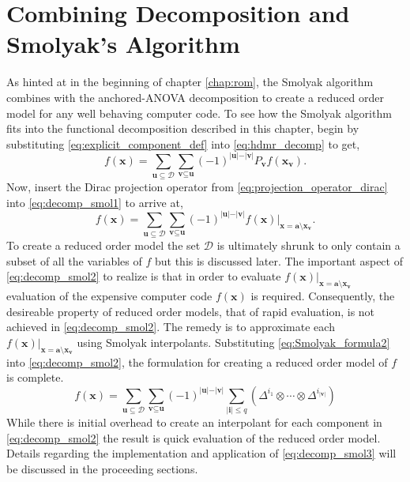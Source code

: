 \section{Combining Decomposition and Smolyak's Algorithm} \label{sec:decomp_and_interp}

As hinted at in the beginning of chapter \ref{chap:rom}, the Smolyak algorithm combines with the anchored-\ac{ANOVA} decomposition to create a reduced order model for any well behaving computer code. To see how the Smolyak algorithm fits into the functional decomposition described in this chapter, begin by substituting \ref{eq:explicit_component_def} into \ref{eq:hdmr_decomp} to get,
\begin{equation} \label{eq:decomp_smol1}
   f(\textbf{x}) = 
    \sum_{\textbf{u}\subseteq\mathcal{D}}
     \sum_{\textbf{v}\subseteq\textbf{u}} 
      (-1)^{\vert\textbf{u}\vert - \vert\textbf{v}\vert}
       P_{\textbf{v}} f(\textbf{x}_{\textbf{v}}).
\end{equation} 
Now, insert the Dirac projection operator from \ref{eq:projection_operator_dirac} into \ref{eq:decomp_smol1} to arrive at,  
\begin{equation} \label{eq:decomp_smol2}
   f(\textbf{x}) = 
    \sum_{\textbf{u}\subseteq\mathcal{D}}
     \sum_{\textbf{v}\subseteq\textbf{u}} 
      (-1)^{\vert\textbf{u}\vert - \vert\textbf{v}\vert}
       f(\textbf{x})\vert_{  
        \textbf{x}=\textbf{a}\setminus\textbf{x}_{\textbf{v}} }.   
\end{equation}
To create a reduced order model the set $\mathcal{D}$ is ultimately shrunk to only contain a subset of all the variables of $f$ but this is discussed later. The important aspect of \ref{eq:decomp_smol2} to realize is that in order to evaluate $ f(\textbf{x}) \vert_{\textbf{x} = \textbf{a} \setminus \textbf{x}_{\textbf{v}}}$ evaluation of the expensive computer code $f(\textbf{x})$ is required. Consequently, the desireable property of reduced order models, that of rapid evaluation, is not achieved in \ref{eq:decomp_smol2}. The remedy is to approximate each $ f(\textbf{x}) \vert_{\textbf{x} = \textbf{a} \setminus \textbf{x}_{\textbf{v}}}$ using Smolyak interpolants. Substituting \ref{eq:Smolyak_formula2} into \ref{eq:decomp_smol2}, the formulation for creating a reduced order model of $f$ is complete. 
\begin{equation} \label{eq:decomp_smol3}
   f(\textbf{x}) = 
    \sum_{\textbf{u}\subseteq\mathcal{D}}
     \sum_{\textbf{v}\subseteq\textbf{u}} 
      (-1)^{\vert\textbf{u}\vert - \vert\textbf{v}\vert}
       \sum_{\vert\textbf{i}\vert\leq q}\left(
        \Delta^{i_1}\otimes\cdots\otimes\Delta^{i_{\vert\textbf{v}\vert}}
         \right)  
\end{equation}
While there is initial overhead to create an interpolant for each component in \ref{eq:decomp_smol2} the result is quick evaluation of the reduced order model. Details regarding the implementation and application of \ref{eq:decomp_smol3} will be discussed in the proceeding sections.               
 

